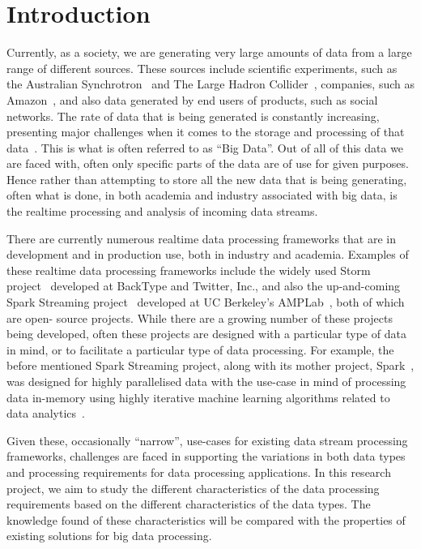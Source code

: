 \documentclass[a4paper,11pt]{article}
\begin{document}

\section{Introduction} %
\label{sec:introduction}

Currently, as a society, we are generating very large amounts of data from a large range of different sources. These
sources include scientific experiments, such as the Australian Synchrotron~\cite{web:synchrotron} and The Large Hadron
Collider~\cite{web:LHC}, companies, such as Amazon~\cite{web:Amazon}, and also data generated by end users of products,
such as social networks. The rate of data that is being generated is constantly increasing, presenting major challenges
when it comes to the storage and processing of that data~\cite{bohlouli_towards_2013}. This is what is often referred to
as ``Big Data''. Out of all of this data we are faced with, often only specific parts of the data are of use for given
purposes. Hence rather than attempting to store all the new data that is being generating, often what is done, in both
academia and industry associated with big data, is the realtime processing and analysis of incoming data streams.

There are currently numerous realtime data processing frameworks that are in development and in production use, both in
industry and academia. Examples of these realtime data processing frameworks include the widely used Storm
project~\cite{web:Storm} developed at BackType and Twitter, Inc., and also the up-and-coming Spark Streaming
project~\cite{web:SparkStreaming} developed at UC Berkeley's AMPLab~\cite{web:UCBerkelyAMCLab}, both of which are open-
source projects. While there are a growing number of these projects being developed, often these projects are designed
with a particular type of data in mind, or to facilitate a particular type of data processing. For example, the before
mentioned Spark Streaming project, along with its mother project, Spark~\cite{web:Spark}, was designed for highly
parallelised data with the use-case in mind of processing data in-memory using highly iterative machine learning
algorithms related to data analytics~\cite{liu_survey_2014}.

Given these, occasionally ``narrow'', use-cases for existing data stream processing frameworks, challenges are faced in
supporting the variations in both data types and processing requirements for data processing applications. In this
research project, we aim to study the different characteristics of the data processing requirements based on the
different characteristics of the data types. The knowledge found of these characteristics will be compared with the
properties of existing solutions for big data processing.
\end{document}
